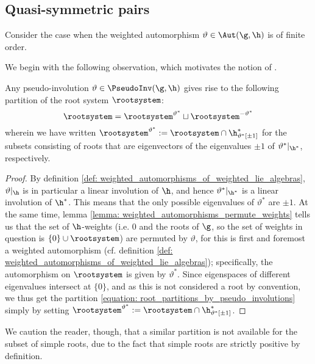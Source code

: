     \subsection{Quasi-symmetric pairs} \label{subsection: quasi_symmetric_pairs}
        Consider the case when the weighted automorphism $\vartheta \in \Aut(\g, \h)$ is of finite order.
    
        We begin with the following observation, which motivates the notion of .
        \begin{lemma} \label{lemma: root_partitions_by_pseudo_involutions}
            Any pseudo-involution $\vartheta \in \PseudoInv(\g, \h)$ gives rise to the following partition of the root system $\rootsystem$:
                \begin{equation} \label{equation: root_partitions_by_pseudo_involutions}
                    \rootsystem = \rootsystem^{\vartheta^*} \sqcup \rootsystem^{-\vartheta^*}
                \end{equation}
            wherein we have written $\rootsystem^{\vartheta^*} := \rootsystem \cap \h^*_{\vartheta^*[\pm 1]}$ for the subsets consisting of roots that are eigenvectors of the eigenvalues $\pm 1$ of $\vartheta^*|_{\h^*}$, respectively.
        \end{lemma}
            \begin{proof}
                By definition \ref{def: weighted_automorphisms_of_weighted_lie_algebras}, $\vartheta|_{\h}$ is in particular a linear involution of $\h$, and hence $\vartheta^*|_{\h^*}$ is a linear involution of $\h^*$. This means that the only possible eigenvalues of $\vartheta^*$ are $\pm 1$. At the same time, lemma \ref{lemma: weighted_automorphisms_permute_weights} tells us that the set of $\h$-weights (i.e. $0$ and the roots of $\g$, so the set of weights in question is $\{0\} \cup \rootsystem$) are permuted by $\vartheta$, for this is first and foremost a weighted automorphism (cf. definition \ref{def: weighted_automorphisms_of_weighted_lie_algebras}); specifically, the automorphism on $\rootsystem$ is given by $\vartheta^*$. Since eigenspaces of different eigenvalues intersect at $\{0\}$, and as this is not considered a root by convention, we thus get the partition \eqref{equation: root_partitions_by_pseudo_involutions} simply by setting $\rootsystem^{\vartheta^*} := \rootsystem \cap \h^*_{\vartheta^*[\pm 1]}$.
            \end{proof}
        \begin{remark}
            We caution the reader, though, that a similar partition is not available for the subset of simple roots, due to the fact that simple roots are strictly positive by definition.
        \end{remark}

